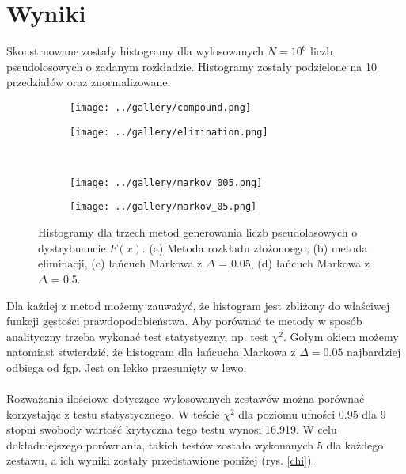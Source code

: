 \documentclass[a4paper,12pt]{article}
\begin{document}
    \section{Wyniki}

    Skonstruowane zostały histogramy dla wylosowanych $N = 10^6$ liczb pseudolosowych o zadanym rozkładzie.
    Histogramy zostały podzielone na 10 przedziałów oraz znormalizowane.
    
    \begin{figure}[h]
        \centering
        \begin{subfigure}{0.49\textwidth}
            \texttt{[image: ../gallery/compound.png]}
            \caption{}
        \end{subfigure}
        \begin{subfigure}{0.49\textwidth}
            \texttt{[image: ../gallery/elimination.png]}
            \caption{}
        \end{subfigure}
        \\
        \begin{subfigure}{0.49\textwidth}
            \texttt{[image: ../gallery/markov\_005.png]}
            \caption{}
        \end{subfigure}
        \begin{subfigure}{0.49\textwidth}
            \texttt{[image: ../gallery/markov\_05.png]}
            \caption{}
        \end{subfigure}
        \caption{Histogramy dla trzech metod generowania liczb pseudolosowych 
        o dystrybuancie $F(x)$. (a) Metoda rozkładu złożonoego, (b) metoda eliminacji,
        (c) łańcuch Markowa z $\Delta$ = 0.05, (d) łańcuch Markowa z $\Delta$ = 0.5.}
    \end{figure}

    \noaka Dla każdej z metod możemy zauważyć, że histogram jest zbliżony do właściwej funkcji gęstości prawdopodobieństwa.
    Aby porównać te metody w sposób analityczny trzeba wykonać test statystyczny, np. test $\chi^2$.
    Gołym okiem możemy natomiast stwierdzić, że histogram dla łańcucha Markowa z $\Delta = 0.05$ najbardziej odbiega od fgp.
    Jest on lekko przesunięty w lewo. 
    \\
    \\
    Rozważania ilościowe dotyczące wylosowanych zestawów można porównać korzystając z testu statystycznego.
    W teście $\chi^2$ dla poziomu ufności $0.95$ dla 9 stopni swobody wartość krytyczna tego testu wynosi 16.919.
    W celu dokładniejszego porównania, takich testów zostało wykonanych 5 dla każdego zestawu, a ich wyniki zostały przedstawione poniżej (rys. \ref{chi}).
   
\end{document}
